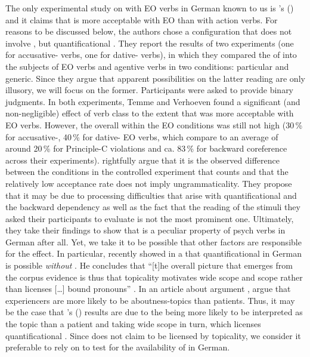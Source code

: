 \documentclass[output=paper,colorlinks,citecolor=brown]{langscibook}
\begin{document}
The only experimental study on  with EO verbs in German known to us is \citeauthor{temme_backward_2017}'s (\citeyear{temme_backward_2017}) and it claims that  is more acceptable with EO than with action verbs.
For reasons to be discussed below, the authors chose a configuration that does not involve , but quantificational .
They report the results of two experiments (one for accusative- verbs, one for dative- verbs), in which they compared the  of  into the subjects of EO verbs and agentive verbs in two conditions: particular and generic.
Since they argue that apparent  possibilities on the latter reading are only illusory, we will focus on the former.
Participants were asked to provide binary  judgments.
In both experiments, Temme and Verhoeven found a significant (and non-negligible) effect of verb class to the extent that  was more acceptable with EO verbs.
However, the overall  within the EO conditions was still not high (30\,\% for accusative-, 40\,\% for dative- EO verbs, which compare to an average  of around 20\,\% for Principle-C violations and ca. 83\,\% for backward coreference across their experiments).
\textcite{temme_backward_2017} rightfully argue that it is the observed difference between the conditions in the controlled experiment that counts and that the relatively low acceptance rate does not imply ungrammaticality.
They propose that it may be due to processing difficulties that arise with quantificational  and the backward dependency as well as the fact that the reading of the stimuli they asked their participants to evaluate is not the most prominent one.
Ultimately, they take their findings to show that  is a peculiar property of psych verbs in German after all.
Yet, we take it to be possible that other factors are responsible for the effect.
In particular, \textcite{webelhuth_command_2022} recently showed in a  that quantificational  in German is possible \emph{without} .
He concludes that \enquote{[t]he overall picture that emerges from the corpus evidence is thus that topicality motivates wide scope and scope rather than  licenses [\dots] bound pronouns} \parencite[387]{webelhuth_command_2022}.
In an article about argument , \textcite{temme_verb_2016} argue that experiencers are more likely to be aboutness-topics than patients.
Thus, it may be the case that \citeauthor{temme_backward_2017}'s (\citeyear{temme_backward_2017}) results are due to the  being more likely to be interpreted as the topic than a patient and taking wide scope in turn, which licenses quantificational .
Since \textcite{webelhuth_command_2022} does not claim   to be licensed by topicality, we consider it preferable to rely on   to test for the availability of  in German.
\end{document}

